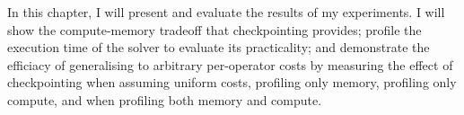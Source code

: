 In this chapter, I will present and evaluate the results of my experiments.
I will show the compute-memory tradeoff that checkpointing provides; profile the execution time of the solver to evaluate its practicality; and demonstrate the efficiacy of generalising to arbitrary per-operator costs by measuring the effect of checkpointing when assuming uniform costs, profiling only memory, profiling only compute, and when profiling both memory and compute.
